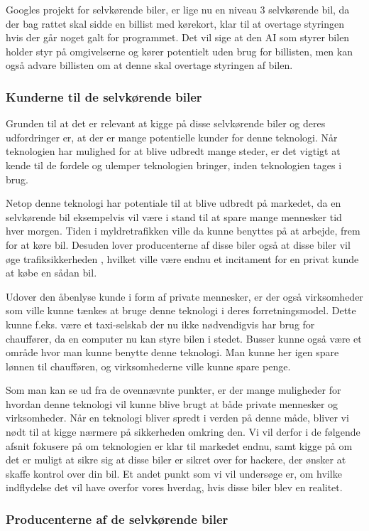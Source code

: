 Googles projekt for selvkørende biler, er lige nu en niveau 3 selvkørende bil, da der bag rattet skal sidde en billist med kørekort, klar til at overtage styringen hvis der går noget galt for programmet. Det vil sige at den AI som styrer bilen holder styr på omgivelserne og kører potentielt uden brug for billisten, men kan også advare billisten om at denne skal overtage styringen af bilen.

\subsubsection{Kunderne til de selvkørende biler}
Grunden til at det er relevant at kigge på disse selvkørende biler og deres udfordringer er, at der er mange potentielle kunder for denne teknologi. Når teknologien har mulighed for at blive udbredt mange steder, er det vigtigt at kende til de fordele og ulemper teknologien bringer, inden teknologien tages i brug.

Netop denne teknologi har potentiale til at blive udbredt på markedet, da en selvkørende bil eksempelvis vil være i stand til at spare mange mennesker tid hver morgen. Tiden i myldretrafikken ville da kunne benyttes på at arbejde, frem for at køre bil. Desuden lover producenterne af disse biler også at disse biler vil øge trafiksikkerheden \cite{GOOG_SITE}, hvilket ville være endnu et incitament for en privat kunde at købe en sådan bil.

Udover den åbenlyse kunde i form af private mennesker, er der også virksomheder som ville kunne tænkes at bruge denne teknologi i deres forretningsmodel. Dette kunne f.eks. være et taxi-selskab der nu ikke nødvendigvis har brug for chauffører, da en computer nu kan styre bilen i stedet. Busser kunne også være et område hvor man kunne benytte denne teknologi. Man kunne her igen spare lønnen til chaufføren, og virksomhederne ville kunne spare penge.

Som man kan se ud fra de ovennævnte punkter, er der mange muligheder for hvordan denne teknologi vil kunne blive brugt at både private mennesker og virksomheder. Når en teknologi bliver spredt i verden på denne måde, bliver vi nødt til at kigge nærmere på sikkerheden omkring den. Vi vil derfor i de følgende afsnit fokusere på om teknologien er klar til markedet endnu, samt kigge på om det er muligt at sikre sig at disse biler er sikret over for hackere, der ønsker at skaffe kontrol over din bil. Et andet punkt som vi vil undersøge er, om hvilke indflydelse det vil have overfor vores hverdag, hvis disse biler blev en realitet.

\subsubsection{Producenterne af de selvkørende biler}
